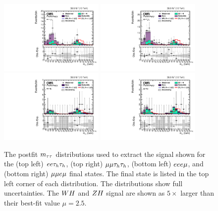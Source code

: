 \begin{figure}[h!]
 \begin{center}
  \includegraphics[width=0.45\textwidth]{higgs_to_taus_vh/plots/zh/eett_postfit.pdf}
  \includegraphics[width=0.45\textwidth]{higgs_to_taus_vh/plots/zh/mmtt_postfit.pdf}
  \includegraphics[width=0.45\textwidth]{higgs_to_taus_vh/plots/zh/eeem_postfit.pdf}
  \includegraphics[width=0.45\textwidth]{higgs_to_taus_vh/plots/zh/emmm_postfit.pdf}
 \end{center}
 \caption{The postfit $m_{\tau\tau}$ distributions used to extract the signal shown
  for the (top left) $ee\tau_{h}\tau_{h}$, (top right) $\mu\mu\tau_{h}\tau_{h}$, 
  (bottom left) $eee\mu$, and (bottom right) $\mu\mu e\mu$
  final states. The final state is listed in the
  top left corner of each distribution.
  The distributions show full uncertainties.
  The $WH$ and $ZH$ signal are shown as $5\times$ larger than their best-fit
  value $\mu = 2.5$.
 }
 \label{fig:zh_all_eight2}
\end{figure}

